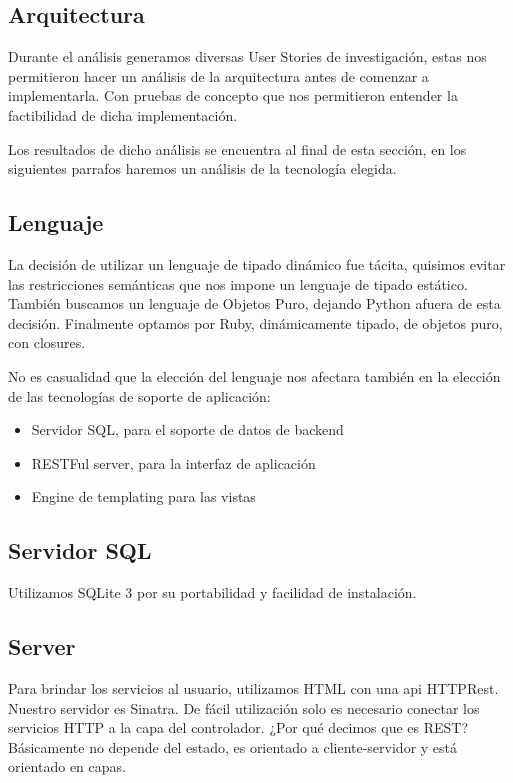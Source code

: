 \subsection{Arquitectura} %
\label{sub:Arquitectura}

Durante el an\'alisis generamos diversas User Stories de investigaci\'on, estas nos permitieron hacer un an\'alisis de la arquitectura antes de comenzar a implementarla.
Con pruebas de concepto que nos permitieron entender la factibilidad de dicha implementaci\'on.

Los resultados de dicho an\'alisis se encuentra al final de esta secci\'on, en los siguientes parrafos haremos un an\'alisis de la tecnolog\'ia elegida.

\subsection{Lenguaje}
La decisi\'on de utilizar un lenguaje de tipado din\'amico fue t\'acita, quisimos evitar las restricciones sem\'anticas que nos impone un lenguaje de tipado est\'atico.  
Tambi\'en buscamos un lenguaje de Objetos Puro, dejando Python afuera de esta decisi\'on.  
Finalmente optamos por Ruby, din\'amicamente tipado, de objetos puro, con closures.


No es casualidad que la elecci\'on del lenguaje nos afectara tambi\'en en la elecci\'on de las tecnolog\'ias de soporte de aplicaci\'on:
\begin{itemize}
    \item Servidor SQL, para el soporte de datos de backend
    \item RESTFul server, para la interfaz de aplicaci\'on
    \item Engine de templating para las vistas
\end{itemize}

\subsection{Servidor SQL}
Utilizamos SQLite 3 por su portabilidad y facilidad de instalaci\'on.

\subsection{Server}

Para brindar los servicios al usuario, utilizamos HTML con una api HTTPRest. Nuestro servidor es Sinatra. De f\'acil utilizaci\'on solo es necesario conectar los servicios HTTP a la capa del controlador. ¿Por qué decimos que es REST? B\'asicamente no depende del estado, es orientado a cliente-servidor y est\'a orientado en capas.

